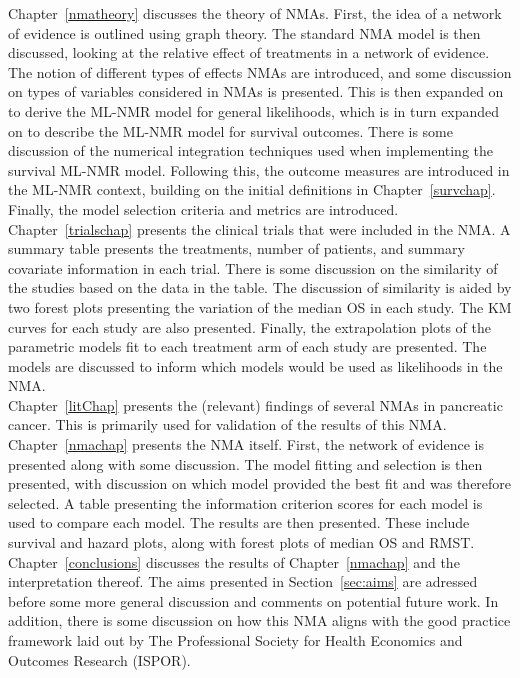 Chapter~\ref{nmatheory} discusses the theory of NMAs. First, the idea of a network of evidence is outlined using graph theory. The standard NMA model is then discussed, looking at the relative effect of treatments in a network of evidence. The notion of different types of effects NMAs are introduced, and some discussion on types of variables considered in NMAs is presented. This is then expanded on to derive the ML-NMR model for general likelihoods, which is in turn expanded on to describe the ML-NMR model for survival outcomes. There is some discussion of the numerical integration techniques used when implementing the survival ML-NMR model. Following this, the outcome measures are introduced in the ML-NMR context, building on the initial definitions in Chapter~\ref{survchap}. Finally, the model selection criteria and metrics are introduced. \\

Chapter~\ref{trialschap} presents the clinical trials that were included in the NMA. A summary table presents the treatments, number of patients, and summary covariate information in each trial. There is some discussion on the similarity of the studies based on the data in the table. The discussion of similarity is aided by two forest plots presenting the variation of the median OS in each study. The KM curves for each study are also presented. Finally, the extrapolation plots of the parametric models fit to each treatment arm of each study are presented. The models are discussed to inform which models would be used as likelihoods in the NMA. \\

Chapter~\ref{litChap} presents the (relevant) findings of several NMAs in pancreatic cancer. This is primarily used for validation of the results of this NMA. \\

Chapter~\ref{nmachap} presents the NMA itself. First, the network of evidence is presented along with some discussion. The model fitting and selection is then presented, with discussion on which model provided the best fit and was therefore selected. A table presenting the information criterion scores for each model is used to compare each model. The results are then presented. These include survival and hazard plots, along with forest plots of median OS and RMST. \\

Chapter~\ref{conclusions} discusses the results of Chapter~\ref{nmachap} and the interpretation thereof. The aims presented in Section~\ref{sec:aims} are adressed before some more general discussion and comments on potential future work. In addition, there is some discussion on how this NMA aligns with the good practice framework laid out by The Professional Society for Health Economics and Outcomes Research (ISPOR).\\

